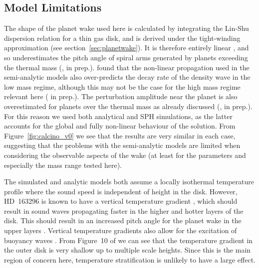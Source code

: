 \subsection{Model Limitations} \label{sec:limitations}

The shape of the planet wake used here is calculated by integrating the Lin-Shu dispersion relation for a thin gas disk, and is derived under the tight-winding approximation (see section~\ref{sec:planetwake}).
It is therefore entirely linear \citep{ogilvie2002}, and so underestimates the pitch angle of spiral arms generated by planets exceeding the thermal mass (\citealt{zhu2015,bae2018a,cimerman2021}, \citeauthor{fasanoinprep.} in prep.).
\citet{cimerman2021} found that the non-linear propagation used in the semi-analytic models also over-predicts the decay rate of the density wave in the low mass regime, although this may not be the case for the high mass regime relevant here (\citeauthor{fasanoinprep.} in prep.).
The perturbation amplitude near the planet is also overestimated for planets over the thermal mass as already discussed (\citealt{goodman2001}, \citeauthor{fasanoinprep.} in prep.).
For this reason we used both analytical and SPH simulations, as the latter accounts for the global and fully non-linear behaviour of the solution.
From Figure~\ref{fig:calcino_v0} we see that the results are very similar in each case, suggesting that the problems with the semi-analytic models are limited when considering the observable aspects of the wake (at least for the parameters and especially the mass range tested here).

The simulated and analytic models both assume a locally isothermal temperature profile where the sound speed is independent of height in the disk.
However, HD~163296 is known to have a vertical temperature gradient \citep{rosenfeld2013,degregorio-monsalvo2013}, which should result in sound waves propagating faster in the higher and hotter layers of the disk.
This should result in an increased pitch angle for the planet wake in the upper layers \citep{juhasz2018}.
Vertical temperature gradients also allow for the excitation of buoyancy waves \citep{bae2021}.
From Figure~10 of \citet{law2021} we can see that the temperature gradient in the outer disk is very shallow up to multiple scale heights. 
Since this is the main region of concern here, temperature stratification is unlikely to have a large effect.


